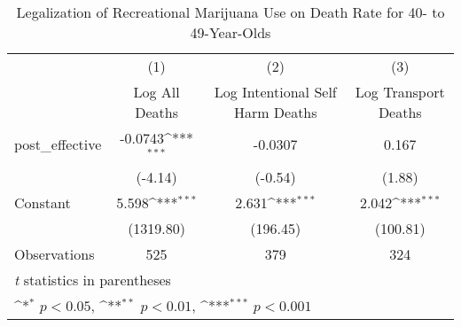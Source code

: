 \begin{table}[htbp]\centering
\def\sym#1{\ifmmode^{#1}\else\(^{#1}\)\fi}
\caption{Legalization of Recreational Marijuana Use on Death Rate for 40- to 49-Year-Olds}
\begin{tabular}{l*{3}{c}}
\hline\hline
                    &\multicolumn{1}{c}{(1)}&\multicolumn{1}{c}{(2)}&\multicolumn{1}{c}{(3)}\\
                    &\multicolumn{1}{c}{Log All Deaths}&\multicolumn{1}{c}{Log Intentional Self Harm Deaths}&\multicolumn{1}{c}{Log Transport Deaths}\\
\hline
post\_effective      &     -0.0743\sym{***}&     -0.0307         &       0.167         \\
                    &     (-4.14)         &     (-0.54)         &      (1.88)         \\
[1em]
Constant            &       5.598\sym{***}&       2.631\sym{***}&       2.042\sym{***}\\
                    &   (1319.80)         &    (196.45)         &    (100.81)         \\
\hline
Observations        &         525         &         379         &         324         \\
\hline\hline
\multicolumn{4}{l}{\footnotesize \textit{t} statistics in parentheses}\\
\multicolumn{4}{l}{\footnotesize \sym{*} \(p<0.05\), \sym{**} \(p<0.01\), \sym{***} \(p<0.001\)}\\
\end{tabular}
\end{table}
